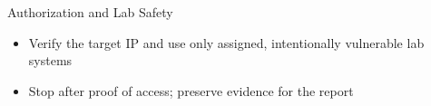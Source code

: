\begin{frame}[t]{Authorization and Lab Safety}
  \begin{itemize}
    \setlength{\itemsep}{0.14cm}
    \item Verify the target IP and use only assigned, intentionally vulnerable lab systems
    \item Stop after proof of access; preserve evidence for the report
  \end{itemize}
\end{frame}
